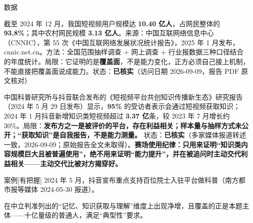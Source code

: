 \documentclass[prep,both]{debate}
\begin{document}
\begin{fields}
\begin{evidence}{数据}
\end{evidence}
\begin{bullets}
\item 截至 2024 年 12 月，我国短视频用户规模达 \textbf{10.40 亿人}，占网民整体的 \textbf{93.8\%}；其中农村网民规模 \textbf{3.13 亿人}。来源：中国互联网络信息中心（CNNIC），第 55 次《中国互联网络发展状况统计报告》，2025 年 1 月发布，cnnic.net.cn。方法：全国范围抽样调查 + 网上调查 + 行业报数据三种口径结合的年度统计。局限：它证明的是\textbf{覆盖面}，不是能力变化，正方必须自己接上机制，不能直接把覆盖面说成能力。状态：\textbf{已核实}（访问日期 2026-09-09，报告 PDF 原文核对）
\item 中国科普研究所与抖音联合发布的《短视频平台共创知识传播新生态》研究报告（2024 年 5 月 29 日发布）显示，\textbf{95\%} 的受访者表示会通过短视频获取知识；2024 年 1 月抖音新增知识类短视频超过 \textbf{3.37 亿}条，较 2023 年 7 月增长约 30\%。局限：\textbf{发布方之一是被评价的平台，存在利益相关；样本量与抽样方式未公开；“获取知识”是自我报告，不是能力测量。} 状态：\textbf{已核实}（多家媒体报道转述一致，2026-09-09；原始报告全文未取得）。\textbf{赛场使用纪律：只用来证明“知识类内容规模巨大且被普遍使用”，绝不用来证明“能力提升”，并在被追问时主动交代利益相关——主动交代比被对方揭穿好。}
\end{bullets}
\begin{evidence}{案例}[有把握]
2024 年 5 月，抖音宣布重点支持百位院士入驻平台做科普（南方都市报等媒体 2024-05-30 报道）。
\end{evidence}
\closing[回扣判准]{在中立判准列出的“记忆、知识获取与理解”维度上出现净增，且覆盖的正是本题主体——十亿量级的普通人，满足“典型性”要求。}
\begin{clash}
\end{clash}
\end{fields}
\end{document}
